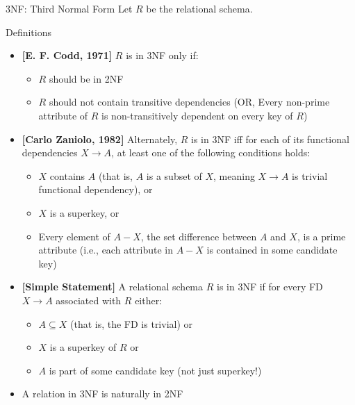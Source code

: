 \documentclass[aspectratio=169, xcolor=dvipsnames]{beamer}
\begin{document}
\begin{frame}{3NF: Third Normal Form}
    Let $R$ be the relational schema.
    \begin{block}{Definitions}
        \begin{itemize}[<+->]
            \item \textbf{[E. F. Codd, 1971]} $R$ is in 3NF only if:
            \begin{itemize}
                \item[$\triangleright$] $R$ should be in 2NF
                \item[$\triangleright$] $R$ should not contain transitive dependencies (OR, Every non-prime attribute of $R$ is non-transitively dependent on every key of $R$)
            \end{itemize}
            \item \textbf{[Carlo Zaniolo, 1982]} Alternately, $R$ is in 3NF iff for each of its functional dependencies $X \rightarrow A$, at least one of the following conditions holds:
            \begin{itemize}
                \item[$\triangleright$] $X$ contains $A$ (that is, $A$ is a subset of $X$, meaning $X \rightarrow A$ is trivial functional dependency), or
                \item[$\triangleright$] $X$ is a superkey, or
                \item[$\triangleright$] Every element of $A - X$, the set difference between $A$ and $X$, is a prime attribute (i.e., each attribute in $A - X$ is contained in some candidate key)
            \end{itemize}
            \item \textbf{[Simple Statement]} A relational schema $R$ is in 3NF if for every FD $X \rightarrow A$ associated with $R$ either:
            \begin{itemize}
                \item[$\triangleright$] $A \subseteq X$ (that is, the FD is trivial) or
                \item[$\triangleright$] $X$ is a superkey of $R$ or
                \item[$\triangleright$] $A$ is part of some candidate key (not just superkey!)
            \end{itemize}
            \item A relation in 3NF is naturally in 2NF
        \end{itemize}
    \end{block}
\end{frame}
\end{document}
